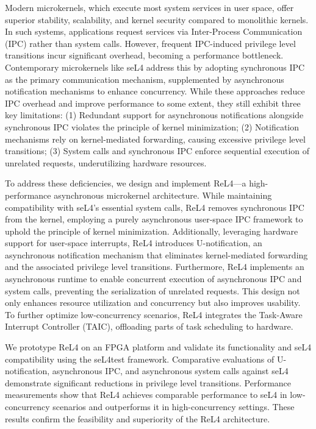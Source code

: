 \begin{englishabstract}
Modern microkernels, which execute most system services in user space, offer superior stability, scalability, and kernel security compared to monolithic kernels. In such systems, applications request services via Inter-Process Communication (IPC) rather than system calls. However, frequent IPC-induced privilege level transitions incur significant overhead, becoming a performance bottleneck. Contemporary microkernels like seL4 address this by adopting synchronous IPC as the primary communication mechanism, supplemented by asynchronous notification mechanisms to enhance concurrency. While these approaches reduce IPC overhead and improve performance to some extent, they still exhibit three key limitations: (1) Redundant support for asynchronous notifications alongside synchronous IPC violates the principle of kernel minimization; (2) Notification mechanisms rely on kernel-mediated forwarding, causing excessive privilege level transitions; (3) System calls and synchronous IPC enforce sequential execution of unrelated requests, underutilizing hardware resources.

To address these deficiencies, we design and implement ReL4—a high-performance asynchronous microkernel architecture. While maintaining compatibility with seL4's essential system calls, ReL4 removes synchronous IPC from the kernel, employing a purely asynchronous user-space IPC framework to uphold the principle of kernel minimization. Additionally, leveraging hardware support for user-space interrupts, ReL4 introduces U-notification, an asynchronous notification mechanism that eliminates kernel-mediated forwarding and the associated privilege level transitions. Furthermore, ReL4 implements an asynchronous runtime to enable concurrent execution of asynchronous IPC and system calls, preventing the serialization of unrelated requests. This design not only enhances resource utilization and concurrency but also improves usability. To further optimize low-concurrency scenarios, ReL4 integrates the Task-Aware Interrupt Controller (TAIC), offloading parts of task scheduling to hardware.
    
We prototype ReL4 on an FPGA platform and validate its functionality and seL4 compatibility using the seL4test framework. Comparative evaluations of U-notification, asynchronous IPC, and asynchronous system calls against seL4 demonstrate significant reductions in privilege level transitions. Performance measurements show that ReL4 achieves comparable performance to seL4 in low-concurrency scenarios and outperforms it in high-concurrency settings. These results confirm the feasibility and superiority of the ReL4 architecture.    


\end{englishabstract}
